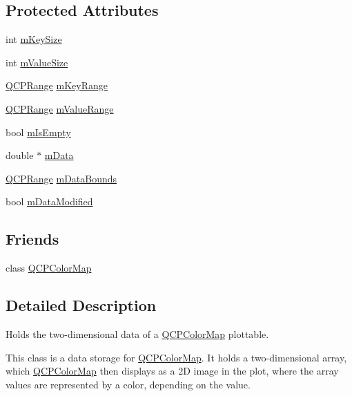 \subsection*{Protected Attributes}
\begin{DoxyCompactItemize}
\item 
int \hyperlink{classQCPColorMapData_a354e06462023340fbc03894b22499f6d}{m\+Key\+Size}
\item 
int \hyperlink{classQCPColorMapData_ae8ee9093632a59f55eb4fc06579ed256}{m\+Value\+Size}
\item 
\hyperlink{classQCPRange}{Q\+C\+P\+Range} \hyperlink{classQCPColorMapData_aaaafd0d7d0f153dbd152f3daf34254ee}{m\+Key\+Range}
\item 
\hyperlink{classQCPRange}{Q\+C\+P\+Range} \hyperlink{classQCPColorMapData_a225bb96f10c1a27b51ae59249477dbef}{m\+Value\+Range}
\item 
bool \hyperlink{classQCPColorMapData_a10e91aa89ed05bd177b1f81e07b465b8}{m\+Is\+Empty}
\item 
double $\ast$ \hyperlink{classQCPColorMapData_ac1682862022f575191351c9825187d39}{m\+Data}
\item 
\hyperlink{classQCPRange}{Q\+C\+P\+Range} \hyperlink{classQCPColorMapData_a1798b3dcc0a27091d196bfd156dcb3f2}{m\+Data\+Bounds}
\item 
bool \hyperlink{classQCPColorMapData_ad3cc682da2ac14e5acdbc05cf4d3d93b}{m\+Data\+Modified}
\end{DoxyCompactItemize}
\subsection*{Friends}
\begin{DoxyCompactItemize}
\item 
class \hyperlink{classQCPColorMapData_afa9d9eab63af3e6f20f882c8d7cc9f20}{Q\+C\+P\+Color\+Map}
\end{DoxyCompactItemize}


\subsection{Detailed Description}
Holds the two-\/dimensional data of a \hyperlink{classQCPColorMap}{Q\+C\+P\+Color\+Map} plottable. 

This class is a data storage for \hyperlink{classQCPColorMap}{Q\+C\+P\+Color\+Map}. It holds a two-\/dimensional array, which \hyperlink{classQCPColorMap}{Q\+C\+P\+Color\+Map} then displays as a 2D image in the plot, where the array values are represented by a color, depending on the value.

